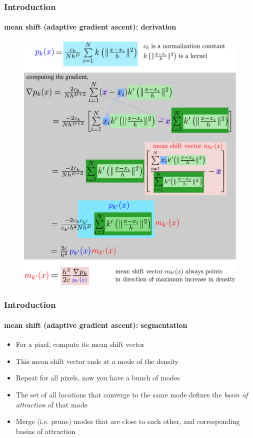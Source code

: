 \begin{frame}
\frametitle{Introduction}
\framesubtitle{mean shift {\small (adaptive gradient ascent)}: derivation}
\logoCSIPCPL\mypagenum
	\begin{figure}				
		\includegraphics[height=.85\textheight]{figs/PRML_meanShift.pdf}
	\end{figure}
\end{frame}


\begin{frame}
\frametitle{Introduction}
\framesubtitle{mean shift {\small (adaptive gradient ascent)}: segmentation}
\logoCSIPCPL\mypagenum
	\begin{itemize}				
		\item For a pixel, compute its mean shift vector
		\item This mean shift vector ends at a mode of the density
		\item Repeat for all pixels, now you have a bunch of modes
		\item The set of all locations that converge to the same mode defines the  {\color{red}\emph {basin of attraction}} of that mode
		\item Merge (i.e. prune) modes that are close to each other, and corresponding basins of attraction
	\end{itemize}
\end{frame}




